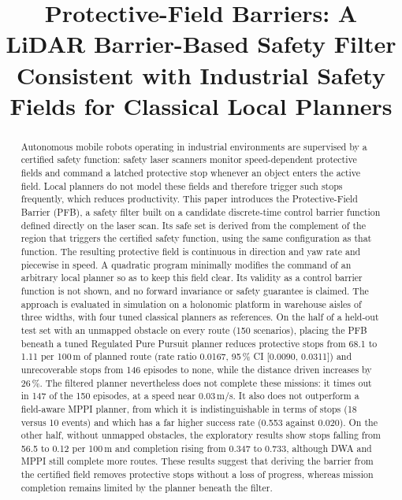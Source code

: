 \documentclass[conference]{IEEEtran}
\begin{document}
\title{Protective-Field Barriers: A LiDAR Barrier-Based Safety Filter Consistent with Industrial Safety Fields for Classical Local Planners}

\author{
}

\maketitle

\begin{abstract}
Autonomous mobile robots operating in industrial environments are supervised by a certified safety
function: safety laser scanners monitor speed-dependent protective fields and command a latched
protective stop whenever an object enters the active field. Local planners do not model these fields
and therefore trigger such stops frequently, which reduces productivity. This paper
introduces the Protective-Field Barrier (PFB), a safety filter built on a candidate discrete-time control
barrier function defined directly on the laser scan. Its safe set is derived from the complement of the region
that triggers the certified safety function, using the same configuration as that function. The resulting
protective field is continuous in direction and yaw rate and piecewise in speed. A quadratic program
minimally modifies the command of an arbitrary local planner so as to keep this field clear. Its
validity as a control barrier function is not shown, and no forward invariance or safety guarantee is claimed. The approach is evaluated in
simulation on a holonomic platform in warehouse aisles of three widths, with four tuned classical
planners as references. On the half of a held-out test set with an unmapped obstacle on every route (150 scenarios), placing the PFB beneath a tuned Regulated Pure Pursuit planner reduces protective stops from 68.1 to 1.11
per 100\,m of planned route (rate ratio 0.0167, 95\,\% CI [0.0090, 0.0311]) and unrecoverable stops from
146 episodes to none, while the distance driven increases by 26\,\%. The filtered planner nevertheless
does not complete these missions: it times out in 147 of the 150 episodes, at a speed near 0.03\,m/s. It
also does not outperform a field-aware MPPI planner, from which it is indistinguishable in terms of stops
(18 versus 10 events) and which has a far higher success rate (0.553 against 0.020). On the other half,
without unmapped obstacles, the exploratory results show stops falling from 56.5 to 0.12 per 100\,m and
completion rising from 0.347 to 0.733, although DWA and MPPI still complete more routes. These results suggest that
deriving the barrier from the certified field removes protective stops without a loss of progress, whereas
mission completion remains limited by the planner beneath the filter.
\end{abstract}
\end{document}
